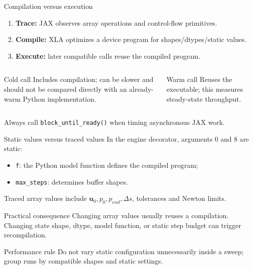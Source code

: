 \documentclass[aspectratio=169,10pt]{beamer}
\newcommand{\state}{\bm{u}}
\begin{document}
\begin{frame}{Compilation versus execution}
\begin{enumerate}
  \item \textbf{Trace:} JAX observes array operations and control-flow primitives.
  \item \textbf{Compile:} XLA optimizes a device program for shapes/dtypes/static values.
  \item \textbf{Execute:} later compatible calls reuse the compiled program.
\end{enumerate}
\begin{columns}[T]
\begin{alertblock}{Cold call}
Includes compilation; can be slower and should not be compared directly with an already-warm Python implementation.
\end{alertblock}
\begin{block}{Warm call}
Reuses the executable; this measures steady-state throughput.
\end{block}
\end{columns}
\vspace{3mm}
Always call \texttt{block\_until\_ready()} when timing asynchronous JAX work.
\end{frame}

\begin{frame}{Static values versus traced values}
In the engine decorator, arguments 0 and 8 are static:
\begin{itemize}
  \item \texttt{f}: the Python model function defines the compiled program;
  \item \texttt{max\_steps}: determines buffer shapes.
\end{itemize}
Traced array values include $\state_0,p_0,p_{end},\Delta s$, tolerances and Newton limits.
\begin{block}{Practical consequence}
Changing array values usually reuses a compilation. Changing state shape, dtype, model function, or static step budget can trigger recompilation.
\end{block}
\begin{alertblock}{Performance rule}
Do not vary static configuration unnecessarily inside a sweep; group runs by compatible shapes and static settings.
\end{alertblock}
\end{frame}
\end{document}
